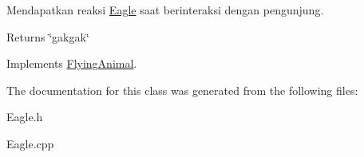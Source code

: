 Mendapatkan reaksi \hyperlink{classEagle}{Eagle} saat berinteraksi dengan pengunjung. 

\begin{DoxyReturn}{Returns}
\char`\"{}gakgak\char`\"{} 
\end{DoxyReturn}


Implements \hyperlink{classFlyingAnimal_ac0eee625fa2235eee8cbdc0a010ae430}{Flying\-Animal}.



The documentation for this class was generated from the following files\-:\begin{DoxyCompactItemize}
\item 
Eagle.\-h\item 
Eagle.\-cpp\end{DoxyCompactItemize}
